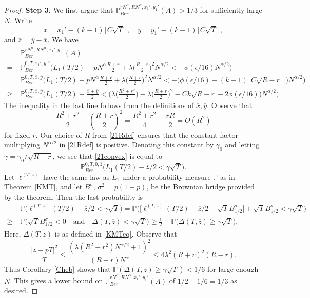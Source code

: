 \begin{proof}
		\noindent\textbf{Step 3.} We first argue that $\mathbb{P}^{rN^\alpha, RN^\alpha,x_1',y_1'}_{Ber} (A) > 1/3$ for sufficiently large $N$. Write 
		\[
		\overline{x} = x_1' - (k-1)\lceil C\sqrt{T}\rceil, \quad \overline{y} = y_1' - (k-1)\lceil C\sqrt{T}\rceil,
		\] 
		and $\overline{z} = \overline{y}-\overline{x}$. We have
		\begin{align}
		& \mathbb{P}^{rN^\alpha, RN^\alpha,x_1',y_1'}_{Ber} (A)\nonumber\\
		= \; &\mathbb{P}^{0,T,x_1',y_1'}_{Ber} \Big(L_1(T/2) - pN^\alpha \frac{R+r}{2} + \lambda\Big(\frac{R+r}{2}\Big)^2 N^{\alpha/2} < -\phi(\epsilon/16)N^{\alpha/2}\Big)\nonumber\\
		= \; & \mathbb{P}^{0,T,\overline{x},\overline{y}}_{Ber}\Big(L_1(T/2) - pN^\alpha\frac{R+r}{2} + \lambda\Big(\frac{R+r}{2}\Big)^2 N^{\alpha/2} < -\big(\phi(\epsilon/16) + (k-1)\lceil C\sqrt{R-r}\,\rceil\big)N^{\alpha/2}\Big)\nonumber\\
		\geq \; & \mathbb{P}^{0,T,\overline{x},\overline{y}}_{Ber}\Big(L_1(T/2) - \frac{\overline{x} + \overline{y}}{2} < \Big( \lambda\Big(\frac{R^2+r^2}{2}\Big) - \lambda\Big(\frac{R+r}{2}\Big)^2 - Ck\sqrt{R-r} - 2\phi(\epsilon/16)\Big)N^{\alpha/2}\Big). \label{21convex}
		\end{align}
		The inequality in the last line follows from the definitions of $\overline{x},\overline{y}$. Observe that
		\[
		\frac{R^2+r^2}{2} - \left(\frac{R+r}{2}\right)^2 = \frac{R^2 + r^2}{4} - \frac{rR}{2} = O(R^2)
		\]
		for fixed $r$. Our choice of $R$ from \eqref{21Rdef} ensures that the constant factor multiplying $N^{\alpha/2}$ in \eqref{21Rdef} is positive. Denoting this constant by $\gamma_0$ and letting $\gamma = \gamma_0/\sqrt{R-r}$, we see that \eqref{21convex} is equal to
		\[
		\mathbb{P}^{0,T,0,\overline{z}}_{Ber}\Big(L_1(T/2) - \overline{z}/2 < \gamma\sqrt{T}\Big).
		\]
		Let $\ell^{(T,\overline{z})}$ have the same law as $L_1$ under a probability measure $\mathbb{P}$ as in Theorem \ref{KMT}, and let $B^\sigma$, $\sigma^2 = p(1-p)$, be the Brownian bridge provided by the theorem. Then the last probability is
		\begin{align*}
		& \mathbb{P}\Big( \ell^{(T,\overline{z})}(T/2) - \overline{z}/2 < \gamma\sqrt{T}\Big) = \mathbb{P}\Big(\Big[\ell^{(T,\overline{z})}(T/2) - \overline{z}/2 - \sqrt{T}B^\sigma_{1/2}\Big] + \sqrt{T}B^\sigma_{1/2} < \gamma\sqrt{T}\Big) \\
		\geq \; & \mathbb{P}\Big(\sqrt{T}B^\sigma_{1/2} < 0\quad\mathrm{and}\quad \Delta(T,\overline{z}) < \gamma\sqrt{T}\Big) \geq \frac{1}{2} - \mathbb{P}\Big(\Delta(T,\overline{z}) \geq \gamma\sqrt{T}\Big).
		\end{align*}
		Here, $\Delta(T,\overline{z})$ is as defined in \eqref{KMTeq}. Observe that
		\begin{equation}\label{21zpT}
		\frac{|\overline{z} - pT|^2}{T} \leq \frac{(\lambda(R^2-r^2) N^{\alpha/2} + 1)^2}{(R-r)N^\alpha} \leq 4\lambda^2(R+r)^2(R-r).
		\end{equation}
		Thus Corollary \ref{Cheb} shows that $\mathbb{P}(\Delta(T,\overline{z})\geq \gamma\sqrt{T})<1/6$ for large enough $N$. This gives a lower bound on $\mathbb{P}^{rN^\alpha, RN^\alpha,x_1',y_1'}_{Ber} (A)$ of $1/2 - 1/6 = 1/3$ as desired.
		

\end{proof}
